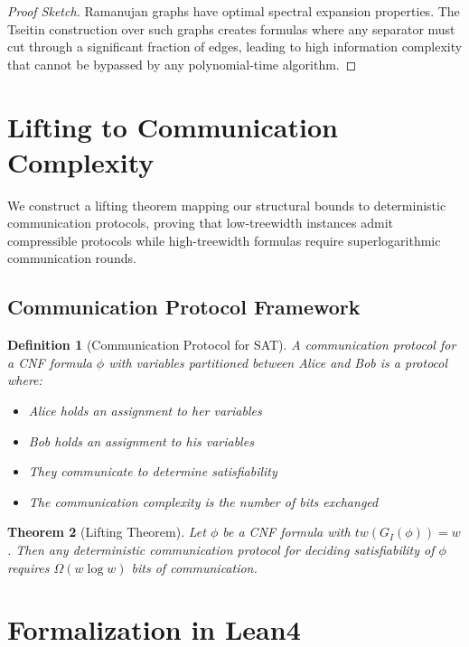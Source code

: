\documentclass[11pt]{article}
\newtheorem{theorem}{Theorem}
\newtheorem{definition}[theorem]{Definition}
\begin{document}
\begin{proof}[Proof Sketch]
Ramanujan graphs have optimal spectral expansion properties. The Tseitin construction over such graphs creates formulas where any separator must cut through a significant fraction of edges, leading to high information complexity that cannot be bypassed by any polynomial-time algorithm.
\end{proof}

\section{Lifting to Communication Complexity}
\label{sec:lifting}

We construct a lifting theorem mapping our structural bounds to deterministic communication protocols, proving that low-treewidth instances admit compressible protocols while high-treewidth formulas require superlogarithmic communication rounds.

\subsection{Communication Protocol Framework}

\begin{definition}[Communication Protocol for SAT]
A communication protocol for a CNF formula $\phi$ with variables partitioned between Alice and Bob is a protocol where:
\begin{itemize}
\item Alice holds an assignment to her variables
\item Bob holds an assignment to his variables
\item They communicate to determine satisfiability
\item The communication complexity is the number of bits exchanged
\end{itemize}
\end{definition}

\begin{theorem}[Lifting Theorem]
\label{thm:lifting}
Let $\phi$ be a CNF formula with $tw(G_I(\phi)) = w$. Then any deterministic communication protocol for deciding satisfiability of $\phi$ requires $\Omega(w \log w)$ bits of communication.
\end{theorem}

\section{Formalization in Lean4}
\end{document}
